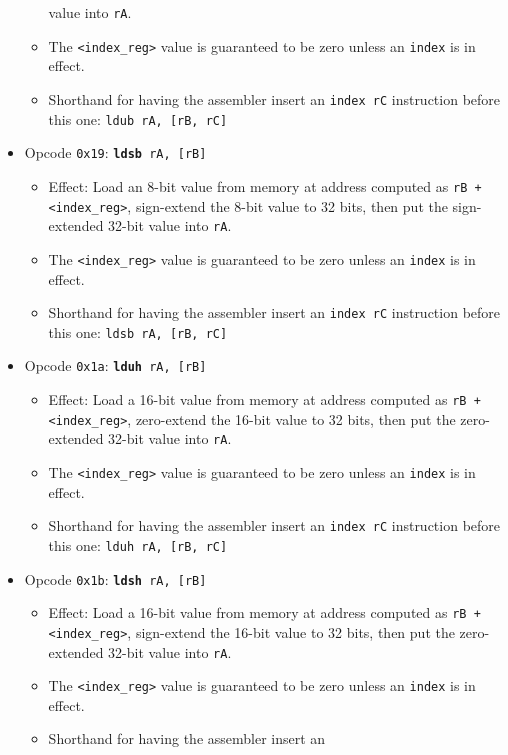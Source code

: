 \documentclass{article}
\begin{document}
\begin{itemize}
\begin{itemize}
		value into \texttt{rA}.
		\item The \texttt{<index\_reg>} value is guaranteed to be zero
		unless an \texttt{index} is in effect.
		\item Shorthand for having the assembler insert an
		\texttt{index rC} instruction before this one:
			\texttt{ldub rA, [rB, rC]}
		\end{itemize}
	\item Opcode \texttt{0x19}:
		\texttt{\textbf{ldsb} rA, [rB]}
		\begin{itemize}
		\item Effect: Load an 8-bit value from memory at address
		computed as \texttt{rB + <index\_reg>}, sign-extend
		the 8-bit value to 32 bits, then put the sign-extended 32-bit
		value into \texttt{rA}.
		\item The \texttt{<index\_reg>} value is guaranteed to be zero
		unless an \texttt{index} is in effect.
		\item Shorthand for having the assembler insert an
		\texttt{index rC} instruction before this one:
			\texttt{ldsb rA, [rB, rC]}
		\end{itemize}
	\item Opcode \texttt{0x1a}:
		\texttt{\textbf{lduh} rA, [rB]}
		\begin{itemize}
		\item Effect: Load a 16-bit value from memory at address
		computed as \texttt{rB + <index\_reg>}, zero-extend
		the 16-bit value to 32 bits, then put the zero-extended 32-bit
		value into \texttt{rA}.
		\item The \texttt{<index\_reg>} value is guaranteed to be zero
		unless an \texttt{index} is in effect.
		\item Shorthand for having the assembler insert an
		\texttt{index rC} instruction before this one:
			\texttt{lduh rA, [rB, rC]}
		\end{itemize}
	\item Opcode \texttt{0x1b}:
		\texttt{\textbf{ldsh} rA, [rB]}
		\begin{itemize}
		\item Effect: Load a 16-bit value from memory at address
		computed as \texttt{rB + <index\_reg>}, sign-extend
		the 16-bit value to 32 bits, then put the zero-extended 32-bit
		value into \texttt{rA}.
		\item The \texttt{<index\_reg>} value is guaranteed to be zero
		unless an \texttt{index} is in effect.
		\item Shorthand for having the assembler insert an

\end{itemize}
\end{itemize}
\end{document}
